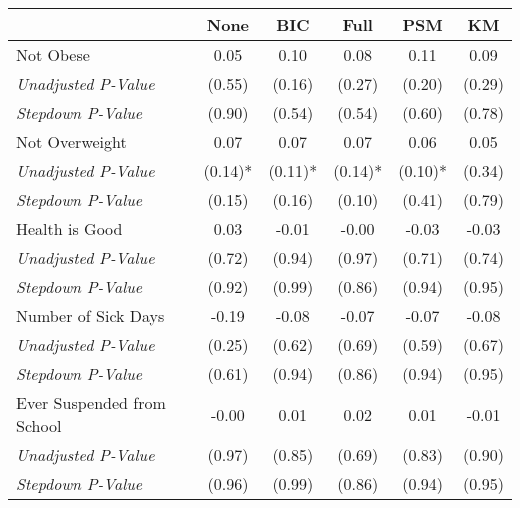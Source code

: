 \begin{tabular}{l c c c c c}
\toprule
 & None & BIC & Full & PSM & KM \\
\midrule
Not Obese & 0.05 & 0.10 & 0.08 & 0.11 & 0.09 \\
\quad \textit{Unadjusted P-Value} & (0.55) & (0.16) & (0.27) & (0.20) & (0.29) \\
\quad \textit{Stepdown P-Value} & (0.90) & (0.54) & (0.54) & (0.60) & (0.78) \\
Not Overweight & 0.07 & 0.07 & 0.07 & 0.06 & 0.05 \\
\quad \textit{Unadjusted P-Value} & (0.14)* & (0.11)* & (0.14)* & (0.10)* & (0.34) \\
\quad \textit{Stepdown P-Value} & (0.15) & (0.16) & (0.10) & (0.41) & (0.79) \\
Health is Good & 0.03 & -0.01 & -0.00 & -0.03 & -0.03 \\
\quad \textit{Unadjusted P-Value} & (0.72) & (0.94) & (0.97) & (0.71) & (0.74) \\
\quad \textit{Stepdown P-Value} & (0.92) & (0.99) & (0.86) & (0.94) & (0.95) \\
Number of Sick Days & -0.19 & -0.08 & -0.07 & -0.07 & -0.08 \\
\quad \textit{Unadjusted P-Value} & (0.25) & (0.62) & (0.69) & (0.59) & (0.67) \\
\quad \textit{Stepdown P-Value} & (0.61) & (0.94) & (0.86) & (0.94) & (0.95) \\
Ever Suspended from School & -0.00 & 0.01 & 0.02 & 0.01 & -0.01 \\
\quad \textit{Unadjusted P-Value} & (0.97) & (0.85) & (0.69) & (0.83) & (0.90) \\
\quad \textit{Stepdown P-Value} & (0.96) & (0.99) & (0.86) & (0.94) & (0.95) \\
\bottomrule
\end{tabular}
